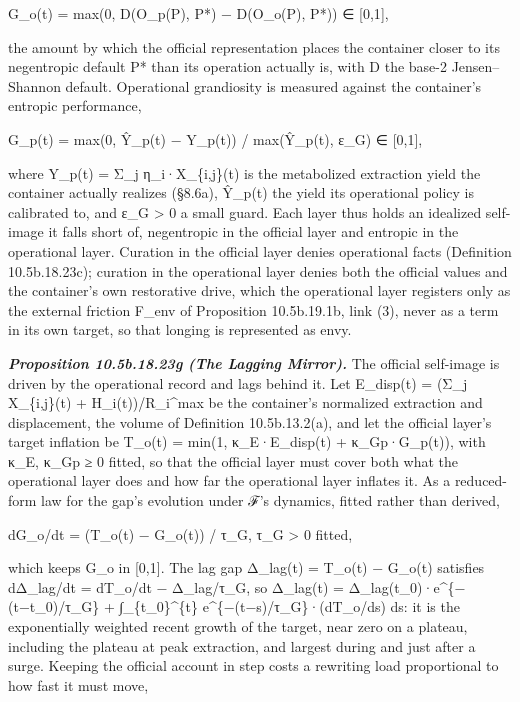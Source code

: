 \documentclass[
]{article}
\begin{document}
G\_o(t) = max(0, D(O\_p(P), P*) − D(O\_o(P), P*)) ∈ {[}0,1{]},

the amount by which the official representation places the container
closer to its negentropic default P* than its operation actually is,
with D the base-2 Jensen--Shannon default. Operational grandiosity is
measured against the container's entropic performance,

G\_p(t) = max(0, Ŷ\_p(t) − Y\_p(t)) / max(Ŷ\_p(t), ε\_G) ∈ {[}0,1{]},

where Y\_p(t) = Σ\_j η\_i·X\_\{i,j\}(t) is the metabolized extraction
yield the container actually realizes (§8.6a), Ŷ\_p(t) the yield its
operational policy is calibrated to, and ε\_G \textgreater{} 0 a small
guard. Each layer thus holds an idealized self-image it falls short of,
negentropic in the official layer and entropic in the operational layer.
Curation in the official layer denies operational facts (Definition
10.5b.18.23c); curation in the operational layer denies both the
official values and the container's own restorative drive, which the
operational layer registers only as the external friction F\_env of
Proposition 10.5b.19.1b, link (3), never as a term in its own target, so
that longing is represented as envy.

\emph{\textbf{Proposition 10.5b.18.23g (The Lagging Mirror).}} The
official self-image is driven by the operational record and lags behind
it. Let E\_disp(t) = (Σ\_j X\_\{i,j\}(t) + H\_i(t))/R\_i\^{}max be the
container's normalized extraction and displacement, the volume of
Definition 10.5b.13.2(a), and let the official layer's target inflation
be T\_o(t) = min(1, κ\_E·E\_disp(t) + κ\_Gp·G\_p(t)), with κ\_E, κ\_Gp ≥
0 fitted, so that the official layer must cover both what the
operational layer does and how far the operational layer inflates it. As
a reduced-form law for the gap's evolution under ℱ's dynamics, fitted
rather than derived,

dG\_o/dt = (T\_o(t) − G\_o(t)) / τ\_G, τ\_G \textgreater{} 0 fitted,

which keeps G\_o in {[}0,1{]}. The lag gap Δ\_lag(t) = T\_o(t) − G\_o(t)
satisfies dΔ\_lag/dt = dT\_o/dt − Δ\_lag/τ\_G, so Δ\_lag(t) =
Δ\_lag(t\_0)·e\^{}\{−(t−t\_0)/τ\_G\} + ∫\_\{t\_0\}\^{}\{t\}
e\^{}\{−(t−s)/τ\_G\}·(dT\_o/ds) ds: it is the exponentially weighted
recent growth of the target, near zero on a plateau, including the
plateau at peak extraction, and largest during and just after a surge.
Keeping the official account in step costs a rewriting load proportional
to how fast it must move,
\end{document}
